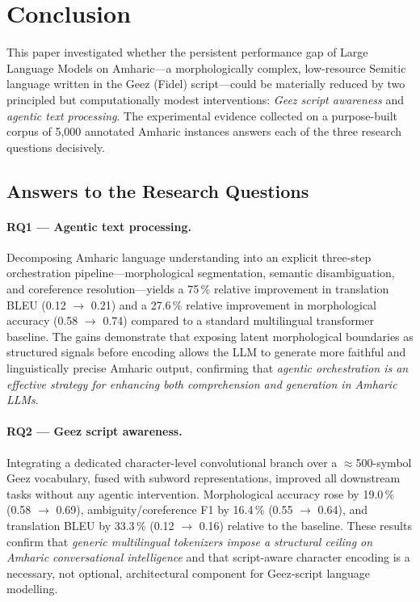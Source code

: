 \section{Conclusion}
\label{sec:conclusion}

This paper investigated whether the persistent performance gap of Large Language Models on
Amharic---a morphologically complex, low-resource Semitic language written in the
Ge\textquotesingle ez (Fidel) script---could be materially reduced by two principled but
computationally modest interventions: \emph{Ge\textquotesingle ez script awareness} and
\emph{agentic text processing}.  The experimental evidence collected on a purpose-built corpus
of 5{,}000 annotated Amharic instances answers each of the three research questions decisively.

\subsection*{Answers to the Research Questions}

\paragraph{RQ1 — Agentic text processing.}
Decomposing Amharic language understanding into an explicit three-step orchestration
pipeline---morphological segmentation, semantic disambiguation, and coreference
resolution---yields a 75\,\% relative improvement in translation BLEU (0.12 $\to$ 0.21) and
a 27.6\,\% relative improvement in morphological accuracy (0.58 $\to$ 0.74) compared to a
standard multilingual transformer baseline.  The gains demonstrate that exposing latent
morphological boundaries as structured signals before encoding allows the LLM to generate
more faithful and linguistically precise Amharic output, confirming that \emph{agentic
orchestration is an effective strategy for enhancing both comprehension and generation in
Amharic LLMs}.

\paragraph{RQ2 — Ge\textquotesingle ez script awareness.}
Integrating a dedicated character-level convolutional branch over a $\approx$500-symbol
Ge\textquotesingle ez vocabulary, fused with subword representations, improved all downstream
tasks without any agentic intervention.  Morphological accuracy rose by 19.0\,\% (0.58
$\to$ 0.69), ambiguity/coreference F1 by 16.4\,\% (0.55 $\to$ 0.64), and translation BLEU
by 33.3\,\% (0.12 $\to$ 0.16) relative to the baseline.  These results confirm that
\emph{generic multilingual tokenizers impose a structural ceiling on Amharic conversational
intelligence} and that script-aware character encoding is a necessary, not optional,
architectural component for Ge\textquotesingle ez-script language modelling.

